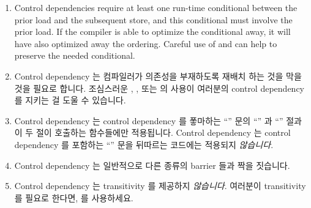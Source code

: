 \begin{enumerate}
\begin{enumerate}
\item	Control dependencies require at least one run-time conditional
	between the prior load and the subsequent store, and this
	conditional must involve the prior load.
	If the compiler is able to optimize the conditional away, it
	will have also optimized away the ordering.
	Careful use of  and  can help
	to preserve the needed conditional.
\fi

\item	Control dependency 는 컴파일러가 의존성을 부재하도록 재배치 하는 것을
	막을 것을 필요로 합니다.
	조심스러운 , , 또는
	 의 사용이 여러분의 control dependency 를 지키는 걸
	도울 수 있습니다.

\item	Control dependency 는 control dependency 를 퐇마하는 ``'' 문의
	``'' 과 ``'' 절과 이 두 절이 호출하는 함수들에만
	적용됩니다.
	Control dependency 는 control dependency 를 포함하는 ``'' 문을
	뒤따르는 코드에는 적용되지 \emph{않습니다}.

\item	Control dependency 는 일반적으로 다른 종류의 barrier 들과 짝을
	짓습니다.

\item	Control dependency 는 transitivity 를 제공하지 \emph{않습니다}.
	여러분이 transitivity 를 필요로 한다면,  를 사용하세요.

\end{enumerate}


\end{enumerate}
